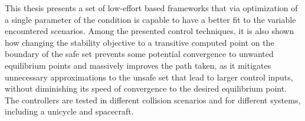 
%


This thesis presents a set of low-effort  based frameworks that via optimization of a single parameter of the  condition is capable to have a better fit to the variable encountered scenarios. Among the presented control techniques, it is also shown how changing the stability objective to a transitive computed point on the boundary of the safe set prevents some potential convergence to unwanted equilibrium points and massively improves the path taken, as it mitigates  unnecessary approximations to the unsafe set that lead to larger control inputs, without diminishing its speed of convergence to the desired equilibrium point. The controllers are tested in different collision scenarios and for different systems, including a unicycle and spacecraft. 













